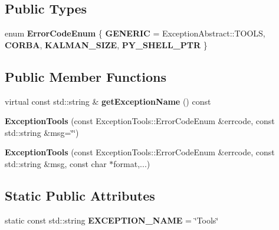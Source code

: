 \subsection*{Public Types}
\begin{DoxyCompactItemize}
\item 
\mbox{\label{classdynamic__graph_1_1ExceptionTools_a729905d84b61fe0895e80ad13982c9cb}} 
enum {\bfseries Error\+Code\+Enum} \{ {\bfseries G\+E\+N\+E\+R\+IC} = Exception\+Abstract\+:\+:T\+O\+O\+LS, 
{\bfseries C\+O\+R\+BA}, 
{\bfseries K\+A\+L\+M\+A\+N\+\_\+\+S\+I\+ZE}, 
{\bfseries P\+Y\+\_\+\+S\+H\+E\+L\+L\+\_\+\+P\+TR}
 \}
\end{DoxyCompactItemize}
\subsection*{Public Member Functions}
\begin{DoxyCompactItemize}
\item 
\mbox{\label{classdynamic__graph_1_1ExceptionTools_a7963a6526507f53fdb03d370cb6b3238}} 
virtual const std\+::string \& {\bfseries get\+Exception\+Name} () const
\item 
\mbox{\label{classdynamic__graph_1_1ExceptionTools_a215023b7c5fd241bf6493e0025172b22}} 
{\bfseries Exception\+Tools} (const Exception\+Tools\+::\+Error\+Code\+Enum \&errcode, const std\+::string \&msg=\char`\"{}\char`\"{})
\item 
\mbox{\label{classdynamic__graph_1_1ExceptionTools_afdd3f8be1a238814b6d676ed72e7bfb6}} 
{\bfseries Exception\+Tools} (const Exception\+Tools\+::\+Error\+Code\+Enum \&errcode, const std\+::string \&msg, const char $\ast$format,...)
\end{DoxyCompactItemize}
\subsection*{Static Public Attributes}
\begin{DoxyCompactItemize}
\item 
\mbox{\label{classdynamic__graph_1_1ExceptionTools_a80e1cf0e61c8a570e9dfc65be97efc0c}} 
static const std\+::string {\bfseries E\+X\+C\+E\+P\+T\+I\+O\+N\+\_\+\+N\+A\+ME} = \char`\"{}Tools\char`\"{}
\end{DoxyCompactItemize}
